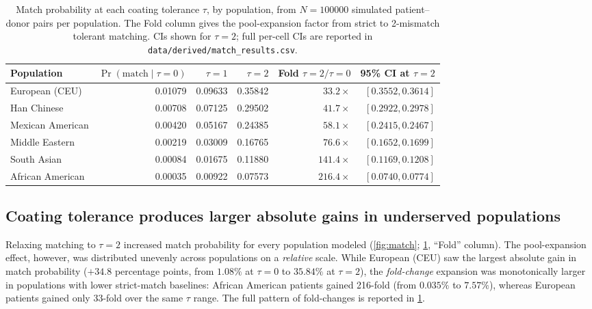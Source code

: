 \documentclass[11pt]{article}
\begin{document}
\begin{table}[htbp]
\centering
\small
\begin{tabular}{lrrrrr}
\toprule
Population & $\Pr(\text{match}\mid\tau{=}0)$ & $\tau{=}1$ & $\tau{=}2$ & Fold $\tau{=}2/\tau{=}0$ & 95\% CI at $\tau{=}2$ \\
\midrule
European (CEU)      & 0.01079 & 0.09633 & 0.35842 & $33.2\times$  & $[0.3552, 0.3614]$ \\
Han Chinese         & 0.00708 & 0.07125 & 0.29502 & $41.7\times$  & $[0.2922, 0.2978]$ \\
Mexican American    & 0.00420 & 0.05167 & 0.24385 & $58.1\times$  & $[0.2415, 0.2467]$ \\
Middle Eastern      & 0.00219 & 0.03009 & 0.16765 & $76.6\times$  & $[0.1652, 0.1699]$ \\
South Asian         & 0.00084 & 0.01675 & 0.11880 & $141.4\times$ & $[0.1169, 0.1208]$ \\
African American    & 0.00035 & 0.00922 & 0.07573 & $216.4\times$ & $[0.0740, 0.0774]$ \\
\bottomrule
\end{tabular}
\caption{Match probability at each coating tolerance $\tau$, by population, from $N = \num{100000}$ simulated patient--donor pairs per population. The Fold column gives the pool-expansion factor from strict to 2-mismatch tolerant matching. CIs shown for $\tau = 2$; full per-cell CIs are reported in \texttt{data/derived/match\_results.csv}.}
\label{tab:main}
\end{table}

\subsection{Coating tolerance produces larger absolute gains in underserved populations}
Relaxing matching to $\tau = 2$ increased match probability for every population modeled (\cref{fig:match}; \cref{tab:main}, ``Fold'' column). The pool-expansion effect, however, was distributed unevenly across populations on a \emph{relative} scale. While European (CEU) saw the largest absolute gain in match probability ($+34.8$ percentage points, from $1.08\%$ at $\tau = 0$ to $35.84\%$ at $\tau = 2$), the \emph{fold-change} expansion was monotonically larger in populations with lower strict-match baselines: African American patients gained 216-fold (from $0.035\%$ to $7.57\%$), whereas European patients gained only 33-fold over the same $\tau$ range. The full pattern of fold-changes is reported in \cref{tab:main}.
\end{document}

